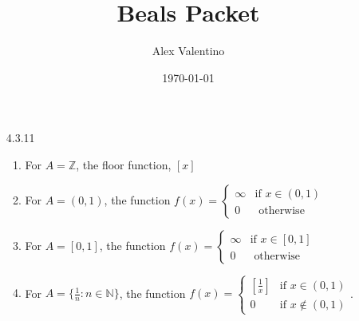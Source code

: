 \documentclass[12pt, letterpaper]{article}
\date{\today}
\author{Alex Valentino}
\title{Beals Packet}
\newcommand{\Z}{\mathbb{Z}}
\newcommand{\N}{\mathbb{N}}
\begin{document}
\begin{enumerate}
	\item[4.3.11]
	\begin{enumerate}
		\item For $A=\Z$, the floor function, $[x]$
		\item For $A=(0,1)$, the function $f(x) = \begin{cases} \infty & \text{if } x \in (0,1) \\ 0 & \text{ otherwise } \end{cases}$
		\item For $A=[0,1]$, the function $f(x) = \begin{cases} \infty & \text{if } x \in [0,1] \\ 0 & \text{ otherwise } \end{cases}$
		\item For $A = \{\frac{1}{n} : n \in \N\}$, the function $f(x) = \begin{cases} [\frac{1}{x}] & \text{if } x \in (0,1)\\ 0 & \text{if } x \not \in (0,1)\end{cases}$.  
	\end{enumerate}
\end{enumerate}
\end{document}
